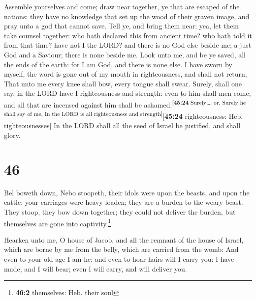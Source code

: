  Assemble yourselves and come; draw near together, ye
that are escaped of the nations: they have no knowledge that set up the
wood of their graven image, and pray unto a god that cannot save.
 Tell ye, and bring them near; yea, let them take counsel
together: who hath declared this from ancient time? who hath told it
from that time? have not I the LORD? and there is no God else beside me;
a just God and a Saviour; there is none beside me.  Look
unto me, and be ye saved, all the ends of the earth: for I am God, and
there is none else.  I have sworn by myself, the word is
gone out of my mouth in righteousness, and shall not return, That unto
me every knee shall bow, every tongue shall swear. 
Surely, shall one say, in the LORD have I righteousness and strength:
even to him shall men come; and all that are incensed against him shall
be ashamed.\textsuperscript{{[}\textbf{45:24} Surely\ldots: or, Surely
he shall say of me, In the LORD is all righteousness and
strength{]}}{[}\textbf{45:24} righteousness: Heb. righteousnesses{]}
 In the LORD shall all the seed of Israel be justified,
and shall glory.

\hypertarget{section-45}{%
\section{46}\label{section-45}}

 Bel boweth down, Nebo stoopeth, their idols were upon the
beasts, and upon the cattle: your carriages were heavy loaden; they are
a burden to the weary beast.  They stoop, they bow down
together; they could not deliver the burden, but themselves are gone
into captivity.\footnote{\textbf{46:2} themselves: Heb. their soul}

 Hearken unto me, O house of Jacob, and all the remnant of
the house of Israel, which are borne by me from the belly, which are
carried from the womb:  And even to your old age I am he;
and even to hoar hairs will I carry you: I have made, and I will bear;
even I will carry, and will deliver you.

